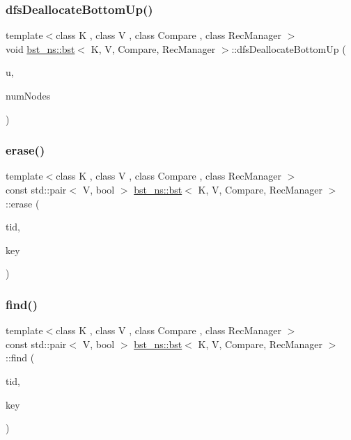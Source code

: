 \subsubsection{\texorpdfstring{dfs\+Deallocate\+Bottom\+Up()}{dfsDeallocateBottomUp()}}
{\footnotesize\ttfamily template$<$class K , class V , class Compare , class Rec\+Manager $>$ \\
void \hyperlink{classbst__ns_1_1bst}{bst\+\_\+ns\+::bst}$<$ K, V, Compare, Rec\+Manager $>$\+::dfs\+Deallocate\+Bottom\+Up (\begin{DoxyParamCaption}\item[{\hyperlink{classbst__ns_1_1Node}{Node}$<$ K, V $>$ $\ast$const}]{u,  }\item[{int $\ast$}]{num\+Nodes }\end{DoxyParamCaption})\hspace{0.3cm}{\ttfamily [inline]}}

\mbox{\label{classbst__ns_1_1bst_aba4ffb8755d802c9ae92c40a275559ac}} 
\subsubsection{\texorpdfstring{erase()}{erase()}}
{\footnotesize\ttfamily template$<$class K , class V , class Compare , class Rec\+Manager $>$ \\
const std\+::pair$<$ V, bool $>$ \hyperlink{classbst__ns_1_1bst}{bst\+\_\+ns\+::bst}$<$ K, V, Compare, Rec\+Manager $>$\+::erase (\begin{DoxyParamCaption}\item[{const int}]{tid,  }\item[{const K \&}]{key }\end{DoxyParamCaption})}

\mbox{\label{classbst__ns_1_1bst_afbc48b466220d2de3bdb6ac29877ecb1}} 
\subsubsection{\texorpdfstring{find()}{find()}}
{\footnotesize\ttfamily template$<$class K , class V , class Compare , class Rec\+Manager $>$ \\
const std\+::pair$<$ V, bool $>$ \hyperlink{classbst__ns_1_1bst}{bst\+\_\+ns\+::bst}$<$ K, V, Compare, Rec\+Manager $>$\+::find (\begin{DoxyParamCaption}\item[{const int}]{tid,  }\item[{const K \&}]{key }\end{DoxyParamCaption})}


